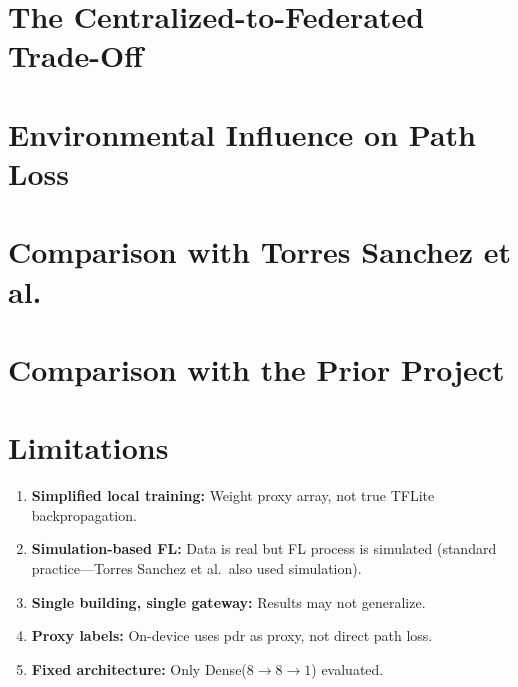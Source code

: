 \documentclass[12pt, a4paper, twoside, openright]{report}
\begin{document}
\section{The Centralized-to-Federated Trade-Off}

\section{Environmental Influence on Path Loss}

\section{Comparison with Torres Sanchez et al.}

\section{Comparison with the Prior Project}

\section{Limitations}
\begin{enumerate}
  \item \textbf{Simplified local training:} Weight proxy array, not true TFLite backpropagation.
  \item \textbf{Simulation-based FL:} Data is real but FL process is simulated (standard practice---Torres Sanchez et al.\ also used simulation).
  \item \textbf{Single building, single gateway:} Results may not generalize.
  \item \textbf{Proxy labels:} On-device uses \gls{pdr} as proxy, not direct path loss.
  \item \textbf{Fixed architecture:} Only Dense($8{\to}8{\to}1$) evaluated.
\end{enumerate}
\end{document}
